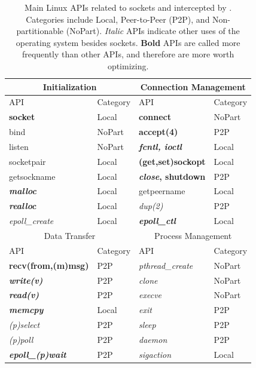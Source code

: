 \begin{table}[htbp]
	\centering
	\small
	\begin{tabular}{ll|ll}
		\toprule
		\multicolumn{2}{c|}{Initialization} &
		\multicolumn{2}{c}{Connection Management} \\
		\midrule
		API & Category &
		API & Category \\
		\midrule
		\textbf{socket} & Local &
		\textbf{connect} & NoPart \\

		bind & NoPart &
		\textbf{accept(4)} & P2P \\

		listen & NoPart &
		\textbf{\textit{fcntl, ioctl}} & Local \\

		socketpair & Local &
		\textbf{(get,set)sockopt} & Local \\

		getsockname  & Local &
		\textbf{\textit{close}, shutdown} & P2P \\

		\textbf{\textit{malloc}} & Local &
		getpeername & Local \\

		\textbf{\textit{realloc}} & Local &
		\textit{dup(2)} & P2P  \\

		\textit{epoll\_create} & Local &
		\textbf{\textit{epoll\_ctl}} & Local \\
		\bottomrule
		\toprule
		\multicolumn{2}{c|}{Data Transfer} &
		\multicolumn{2}{c}{Process Management} \\
		\midrule
		API & Category &
		API & Category \\
		\midrule
		\textbf{recv(from,(m)msg)} & P2P &
		\textit{pthread\_create} & NoPart \\

		\textbf{\textit{write(v)}} & P2P &
		\textit{clone} & NoPart \\

		\textbf{\textit{read(v)}} & P2P &
		\textit{execve} & NoPart \\

		\textbf{\textit{memcpy}} & Local &
		\textit{exit} & P2P \\

		\textit{(p)select} & P2P &
		\textit{sleep} & P2P \\

		\textit{(p)poll} & P2P &
		\textit{daemon} & P2P \\

		\textbf{\textit{epoll\_(p)wait}} & P2P &
		\textit{sigaction} & Local \\
		\bottomrule
	\end{tabular}
	\caption{Main Linux APIs related to sockets and intercepted by \libipc{}. Categories include Local, Peer-to-Peer (P2P), and Non-partitionable (NoPart). \textit{Italic} APIs indicate other uses of the operating system besides sockets. \textbf{Bold} APIs are called more frequently than other APIs, and therefore are more worth optimizing.}
	\label{socksdirect:tab:socket-api}
\end{table}

